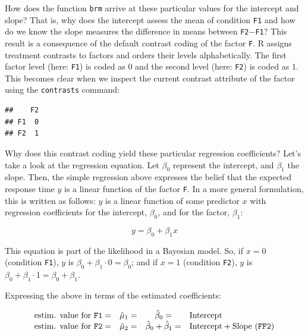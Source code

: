\documentclass[12pt,]{krantz}
\newenvironment{Shaded}{\begin{snugshade}}{\end{snugshade}}
\newcommand{\KeywordTok}[1]{\textcolor[rgb]{0.13,0.29,0.53}{\textbf{#1}}}
\newcommand{\NormalTok}[1]{#1}
\newcommand{\OperatorTok}[1]{\textcolor[rgb]{0.81,0.36,0.00}{\textbf{#1}}}
\theoremstyle{definition}
\theoremstyle{definition}
\theoremstyle{definition}
\theoremstyle{remark}
\begin{document}
How does the function \texttt{brm} arrive at these particular values for the intercept and slope? That is, why does the intercept assess the mean of condition \texttt{F1} and how do we know the slope measures the difference in means between \texttt{F2}\(-\)\texttt{F1}? This result is a consequence of the default contrast coding of the factor \texttt{F}. R assigns treatment contrasts to factors and orders their levels alphabetically. The first factor level (here: \texttt{F1}) is coded as \(0\) and the second level (here: \texttt{F2}) is coded as \(1\). This becomes clear when we inspect the current contrast attribute of the factor using the \texttt{contrasts} command:

\begin{Shaded}
\end{Shaded}

\begin{verbatim}
##    F2
## F1  0
## F2  1
\end{verbatim}

Why does this contrast coding yield these particular regression coefficients? Let's take a look at the regression equation.
Let \(\beta_0\) represent the intercept, and \(\beta_1\) the slope. Then, the simple regression above expresses the belief that the expected response time \(y\) is a linear function of the factor \texttt{F}. In a more general formulation, this is written as follows: \(y\) is a linear function of some predictor \(x\) with regression coefficients for the intercept, \(\beta_0\), and for the factor, \(\beta_1\):

\begin{equation}
y = \beta_0 + \beta_1x
\label{eq:lm1}
\end{equation}

This equation is part of the likelihood in a Bayesian model.
So, if \(x = 0\) (condition \texttt{F1}), \(y\) is \(\beta_0 + \beta_1 \cdot 0 = \beta_0\); and if \(x = 1\) (condition \texttt{F2}), \(y\) is \(\beta_0 + \beta_1 \cdot 1 = \beta_0 + \beta_1\).

Expressing the above in terms of the estimated coefficients:

\begin{equation}
\begin{array}{lccll}
\text{estim. value for \texttt{F1}} = & \hat{\mu}_1 = & \hat{\beta}_0 = & \text{Intercept} \\
\text{estim. value for \texttt{F2}} = & \hat{\mu}_2 = & \hat{\beta}_0 + \hat{\beta}_1 = & \text{Intercept} + \text{Slope (\texttt{FF2})}
\end{array}
\label{eq:predVal}
\end{equation}
\end{document}
